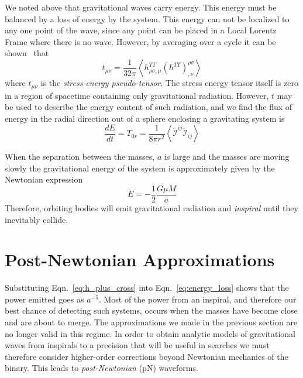 We noted above that gravitational waves carry energy.  This energy
must be balanced by a loss of energy by the system.  This energy can
not be localized to any one point of the wave, since any point can be
placed in a Local Lorentz Frame where there is no wave.  However, by
averaging over a cycle it can be shown~\cite{carrollTextbook} that
%
\begin{equation}
t_{\mu\nu} = \frac{1}{32 \pi} \left\langle h^{TT}_{\rho \sigma,\mu}
(h^{TT})^{\rho\sigma}_{,\nu} \right\rangle
\end{equation}
%
where $t_{\mu\nu}$ is the \emph{stress-energy pseudo-tensor}.  The
stress energy tensor itself is zero in a region of spacetime
containing only gravitational radiation.  However, $t$ may be used to
describe the energy content of such radiation, and we find the flux of
energy in the radial direction out of a sphere enclosing a gravitating
system is
%
\begin{equation}
\label{eq:energy_loss}
\frac{dE}{dt} = T_{0r} = \frac{1}{8 \pi r^2} \left\langle \ddot{\mathcal{I}}^{ij}
\ddot{\mathcal{I}}_{ij} \right\rangle
\end{equation}

When the separation between the masses, $a$ is large and the masses are
moving slowly the gravitational energy of the system is approximately
given by the Newtonian expression
%
\begin{equation*}
E = - \frac{1}{2} \frac{G \mu M}{a}
\end{equation*}
%
Therefore, orbiting bodies will emit gravitational radiation and
\emph{inspiral} until they inevitably collide.

\section{Post-{N}ewtonian Approximations}
\label{sec:PNWaveforms}

Substituting Eqn.~\ref{eq:h_plus_cross} into
Eqn.~\ref{eq:energy_loss} shows that the power emitted goes as
$a^{-5}$.  Most of the power from an inspiral, and therefore our best
chance of detecting such systems, occurs when the masses have become
close and are about to merge.  The approximations we made in the
previous section are no longer valid in this regime.  In order to
obtain analytic models of gravitational waves from inspirals to a
precision that will be useful in searches we must therefore consider
higher-order corrections beyond Newtonian mechanics of the binary.
This leads to \emph{post-Newtonian} (pN) waveforms.

